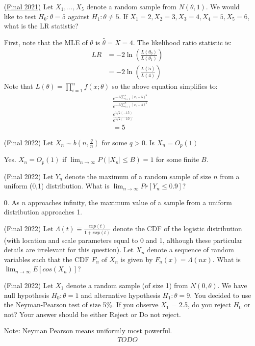 \documentclass[answers]{exam}
\begin{document}
\begin{questions}
\question \href{https://drive.google.com/drive/folders/1f3rKaHYUMvUB4_RBHUFTtTVIzO9osoP4}{(Final 2021)} Let $X_1,...,X_5$ denote a random sample from $N(\theta,1)$. We would like to test $H_0 : \theta = 5$ against $H_1 : \theta \ne 5$. If $X_1=2, X_2=3, X_3=4, X_4=5, X_5=6$, what is the LR statistic?
\begin{solution}
    First, note that the MLE of $\theta$ is $\hat{\theta} = \bar{X} = 4$. The likelihood ratio statistic is:
    \begin{align*} LR &= -2\ln(\frac{L(\theta_0)}{L(\theta_1)})\\
    &= -2\ln(\frac{L(5)}{L(4)})
    \end{align*}
    Note that $L(\theta) = \prod_{i=1}^n f(x;\theta)$ so the above equation simplifies to:
    \begin{align*} &\frac{e^{-.5 \sum_{i=1}^n (x_i - 5)^2}}{e^{-.5 \sum_{i=1}^n (x_i - 4)^2}}\\
    &\frac{e^{1/2(-15)}}{e^{1/2(-10)}} \\
    &= 5\end{align*}
\end{solution}

\question (Final 2022) Let $X_n \sim b(n,\frac{q}{n})$ for some $q>0$. Is $X_n = O_p(1)$
\begin{solution}
    Yes. $X_n = O_p(1)$ if $\lim_{n \to \infty} P(|X_n| \leq B) = 1$ for some finite $B$. 
\end{solution}

\question (Final 2022) Let $Y_n$ denote the maximum of a random sample of size $n$ from a uniform (0,1) distribution. What is $\lim_{n \to \infty} Pr[Y_n \leq 0.9]$?
\begin{solution}
    0. As $n$ approaches infinity, the maximum value of a sample from a uniform distribution approaches 1.
\end{solution}

\question (Final 2022) Let $\Lambda(t) \equiv \frac{exp(t)}{1+exp(t)}$ denote the CDF of the logistic distribution (with location and scale parameters equal to 0 and 1, although these particular details are irrelevant for this question). Let $X_n$ denote a sequence of random variables such that the CDF $F_n$ of $X_n$ is given by $F_n(x) = \Lambda(nx)$. What is $\lim_{n \to \infty} E[cos(X_n)]$?
\begin{solution}

\end{solution}

\question (Final 2022) Let $X_1$ denote a random sample (of size 1) from $N(0, \theta)$. We have null hypothesis $H_0: \theta = 1$ and alternative hypothesis $H_1: \theta = 9$. You decided to use the Neyman-Pearson test of size 5\%. If you observe $X_1$ = 2.5, do you reject $H_0$ or
not? Your answer should be either Reject or Do not reject.
\begin{solution} 
    Note: Neyman Pearson means uniformly most powerful.
    \begin{align*}
        TODO
    \end{align*}
\end{solution}


\end{questions}
\end{document}
